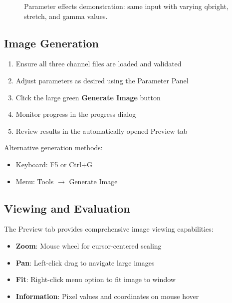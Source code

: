 \documentclass[11pt,a4paper]{article}
\begin{document}
\begin{figure}[H]
\centering
\caption{Parameter effects demonstration: same input with varying qbright,
stretch, and gamma values.}
\label{fig:parameter-effects}
\end{figure}

\subsection{Image Generation}

\begin{enumerate}
\item Ensure all three channel files are loaded and validated
\item Adjust parameters as desired using the Parameter Panel
\item Click the large green \textbf{Generate Image} button
\item Monitor progress in the progress dialog
\item Review results in the automatically opened Preview tab
\end{enumerate}

Alternative generation methods:
\begin{itemize}[leftmargin=*]
\item Keyboard: F5 or Ctrl+G
\item Menu: Tools $\rightarrow$ Generate Image
\end{itemize}

\subsection{Viewing and Evaluation}

The Preview tab provides comprehensive image viewing capabilities:

\begin{itemize}[leftmargin=*]
\item \textbf{Zoom}: Mouse wheel for cursor-centered scaling
\item \textbf{Pan}: Left-click drag to navigate large images
\item \textbf{Fit}: Right-click menu option to fit image to window
\item \textbf{Information}: Pixel values and coordinates on mouse hover
\end{itemize}
\end{document}
